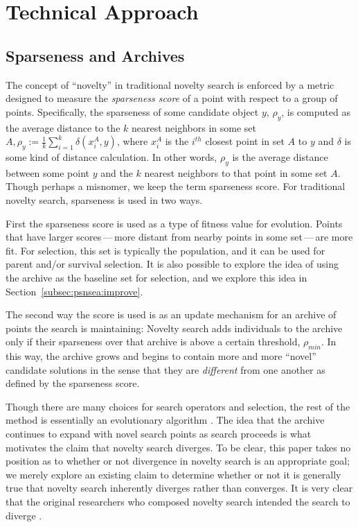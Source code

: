 \documentclass[twoside]{article}
\begin{document}
\section{Technical Approach}
\label{sec:approach}

\subsection{Sparseness and Archives}
\label{subsec:sparseness}

The concept of ``novelty'' in traditional novelty search is enforced by a metric designed to measure the \emph{sparseness score} of a point with respect to a group of points.  Specifically, the sparseness of some candidate object $y$, $\rho_y$, is computed as the average distance to the $k$ nearest neighbors in some set $A, \rho_y := \frac{1}{k} \sum_{i=1}^{k} \delta\left( x^A_i, y\right)$, where $x^A_i$ is the $i^{th}$ closest point in set $A$ to $y$ and $\delta$ is some kind of distance calculation.  In other words, $\rho_y$ is the average distance between some point $y$ and the $k$ nearest neighbors to that point in some set $A$.  Though perhaps a misnomer, we keep the term sparseness score. For traditional novelty search, sparseness is used in two ways.  

First the sparseness score is used as a type of fitness value for evolution.  Points that have larger scores\,---\,more distant from nearby points in some set\,---\,are more fit.  For selection, this set is typically the population, and it can be used for parent and/or survival selection.  It is also possible to explore the idea of using the archive as the baseline set for selection, and we explore this idea in Section~\ref{subsec:psnsea:improve}.

The second way the score is used is as an update mechanism for an archive of points the search is maintaining:  Novelty search adds individuals to the archive only if their sparseness over that archive is above a certain threshold, $\rho_{min}$.  In this way, the archive grows and begins to contain more and more ``novel'' candidate solutions in the sense that they are \emph{different} from one another as defined by the sparseness score.

Though there are many choices for search operators and selection, the rest of the method is essentially an evolutionary algorithm \citep{ec:DeJong2006}.  The idea that the archive continues to expand with novel search points as search proceeds is what motivates the claim that novelty search diverges.  To be clear, this paper takes no position as to whether or not divergence in novelty search is an appropriate goal; we merely explore an existing claim to determine whether or not it is generally true that novelty search inherently diverges rather than converges.  It is very clear that the original researchers who composed novelty search intended the search to diverge \citep{Lehman2016frai,Lehman2015gecco,StanleyLehman2015}.
\end{document}
